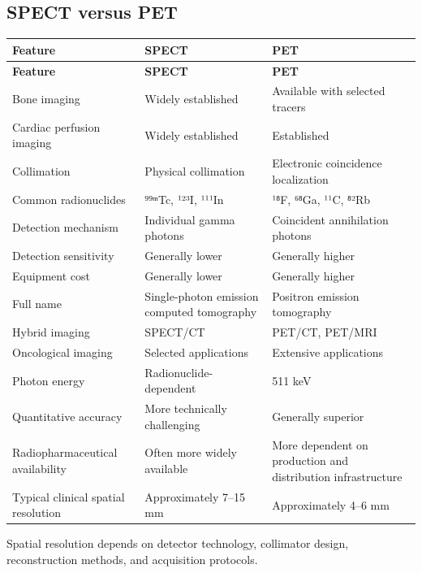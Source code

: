 \subsection{SPECT versus PET}
\begin{longtable}{@{}p{}p{}p{}@{}}
\toprule
\textbf{Feature} & \textbf{SPECT} & \textbf{PET} \\
\midrule
\endfirsthead
\toprule
\textbf{Feature} & \textbf{SPECT} & \textbf{PET} \\
\midrule
\endhead
Bone imaging & Widely established & Available with selected tracers \\
Cardiac perfusion imaging & Widely established & Established \\
Collimation & Physical collimation & Electronic coincidence localization \\
Common radionuclides & ⁹⁹ᵐTc, ¹²³I, ¹¹¹In & ¹⁸F, ⁶⁸Ga, ¹¹C, ⁸²Rb \\
Detection mechanism & Individual gamma photons & Coincident annihilation photons \\
Detection sensitivity & Generally lower & Generally higher \\
Equipment cost & Generally lower & Generally higher \\
Full name & Single-photon emission computed tomography & Positron emission tomography \\
Hybrid imaging & SPECT/CT & PET/CT, PET/MRI \\
Oncological imaging & Selected applications & Extensive applications \\
Photon energy & Radionuclide-dependent & 511 keV \\
Quantitative accuracy & More technically challenging & Generally superior \\
Radiopharmaceutical availability & Often more widely available & More dependent on production and distribution infrastructure \\
Typical clinical spatial resolution & Approximately 7--15 mm & Approximately 4--6 mm \\
\bottomrule
\end{longtable}
Spatial resolution depends on detector technology, collimator design, reconstruction methods, and acquisition protocols.

